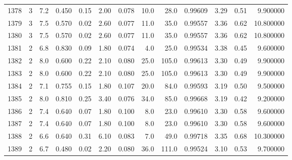\begin{tabular}{lrrrrrrrrrrrr}
1378 &        3 &            7.2 &             0.450 &         0.15 &            2.00 &      0.078 &                 10.0 &                  28.0 &  0.99609 &  3.29 &       0.51 &   9.900000 \\
1379 &        3 &            7.5 &             0.570 &         0.02 &            2.60 &      0.077 &                 11.0 &                  35.0 &  0.99557 &  3.36 &       0.62 &  10.800000 \\
1380 &        3 &            7.5 &             0.570 &         0.02 &            2.60 &      0.077 &                 11.0 &                  35.0 &  0.99557 &  3.36 &       0.62 &  10.800000 \\
1381 &        2 &            6.8 &             0.830 &         0.09 &            1.80 &      0.074 &                  4.0 &                  25.0 &  0.99534 &  3.38 &       0.45 &   9.600000 \\
1382 &        2 &            8.0 &             0.600 &         0.22 &            2.10 &      0.080 &                 25.0 &                 105.0 &  0.99613 &  3.30 &       0.49 &   9.900000 \\
1383 &        2 &            8.0 &             0.600 &         0.22 &            2.10 &      0.080 &                 25.0 &                 105.0 &  0.99613 &  3.30 &       0.49 &   9.900000 \\
1384 &        2 &            7.1 &             0.755 &         0.15 &            1.80 &      0.107 &                 20.0 &                  84.0 &  0.99593 &  3.19 &       0.50 &   9.500000 \\
1385 &        2 &            8.0 &             0.810 &         0.25 &            3.40 &      0.076 &                 34.0 &                  85.0 &  0.99668 &  3.19 &       0.42 &   9.200000 \\
1386 &        2 &            7.4 &             0.640 &         0.07 &            1.80 &      0.100 &                  8.0 &                  23.0 &  0.99610 &  3.30 &       0.58 &   9.600000 \\
1387 &        2 &            7.4 &             0.640 &         0.07 &            1.80 &      0.100 &                  8.0 &                  23.0 &  0.99610 &  3.30 &       0.58 &   9.600000 \\
1388 &        2 &            6.6 &             0.640 &         0.31 &            6.10 &      0.083 &                  7.0 &                  49.0 &  0.99718 &  3.35 &       0.68 &  10.300000 \\
1389 &        2 &            6.7 &             0.480 &         0.02 &            2.20 &      0.080 &                 36.0 &                 111.0 &  0.99524 &  3.10 &       0.53 &   9.700000 \\

\end{tabular}
